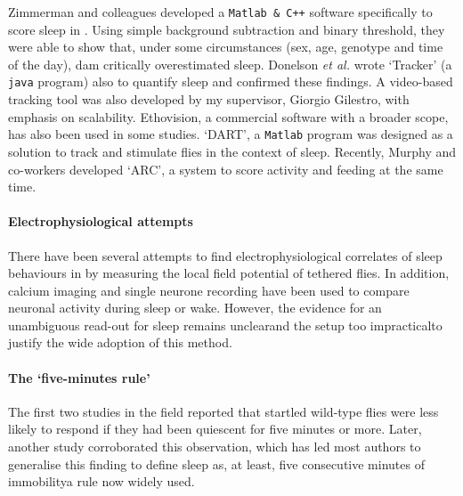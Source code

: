 Zimmerman and colleagues developed a \texttt{Matlab~\&~C++} software specifically to score sleep in \droso{}\cite{zimmerman_video_2008}.
Using simple background subtraction and binary threshold, they were able to show that, under some circumstances (sex, age, genotype and time of the day),
\gls{dam} critically overestimated sleep.
Donelson \emph{et al.} wrote `Tracker' (a \texttt{java} program) also to quantify sleep and confirmed these findings\cite{donelson_high-resolution_2012}.
A video-based tracking tool was also developed by my supervisor, Giorgio Gilestro, with emphasis on scalability\cite{gilestro_video_2012}.
Ethovision, a commercial software with a broader scope, has also been used in some studies\cite{garbe_context-specific_2015,cavanaugh_drosophila_2016}.
`DART', a \texttt{Matlab} program was designed as a solution to track and stimulate flies in the context of sleep\cite{faville_how_2015}.
Recently, Murphy and co-workers developed `ARC', a system to score activity and feeding at the same time\cite{murphy_postprandial_2016}.

\paragraph*{Electrophysiological attempts}

There have been several attempts to find electrophysiological correlates of sleep behaviours in \droso{} by measuring the local field potential of tethered flies\cite{nitz_electrophysiological_2002,van_swinderen_uncoupling_2004,van_alphen_dynamic_2013}.
In addition, calcium imaging\cite{bushey_sleep-_2015} and single neurone recording\cite{pimentel_operation_2016} have been used to compare neuronal activity during sleep or wake.
However, the evidence for an unambiguous read-out for sleep remains unclear\emd{}and the setup too impractical\emd{}to justify the wide adoption of this method.




\paragraph*{The `five-minutes rule'}
The first two studies in the field reported that startled wild-type flies were less likely to respond if they had been quiescent for five minutes or more\cite{hendricks_rest_2000,shaw_correlates_2000}.
Later, another study corroborated this observation\cite{huber_sleep_2004}, which has led most authors to generalise this finding to define sleep as, at least, five consecutive minutes of immobility\emd{}a rule now widely used.

